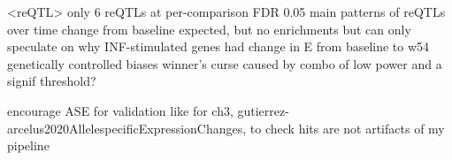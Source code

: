 \begin{outline}



\1 <reQTL>
    \2 only 6 reQTLs at per-comparison FDR 0.05
     main patterns of reQTLs over time
    \2 change from baseline expected, but no enrichments
    \2 but can only speculate on why INF-stimulated genes had change in E from baseline to w54 genetically controlled
    \2 biases
        \3 winner's curse caused by combo of low power and a signif threshold?

    \2 encourage ASE for validation like for ch3, gutierrez-arcelus2020AllelespecificExpressionChanges, to check hits are not artifacts of my pipeline


\end{outline}
